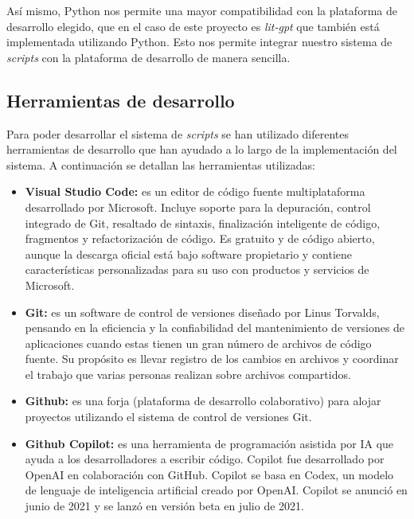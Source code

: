 Así mismo, Python nos permite una mayor compatibilidad con la plataforma de desarrollo elegido, que en el caso
de este proyecto es \textit{lit-gpt} que también está implementada utilizando Python. Esto nos permite
integrar nuestro sistema de \textit{scripts} con la plataforma de desarrollo de manera sencilla.

\subsection{Herramientas de desarrollo}
\label{subsec:herramientas_desarrollo}


Para poder desarrollar el sistema de \textit{scripts} se han utilizado diferentes herramientas de desarrollo que han 
ayudado a lo largo de la implementación del sistema. A continuación se detallan las herramientas utilizadas:

\begin{itemize}
    \item \textbf{Visual Studio Code:} es un editor de código fuente multiplataforma desarrollado por Microsoft.
        Incluye soporte para la depuración, control integrado de Git, resaltado de sintaxis, 
        finalización inteligente de código, fragmentos y refactorización de código. Es gratuito y de código abierto,
        aunque la descarga oficial está bajo software propietario y contiene características personalizadas 
        para su uso con productos y servicios de Microsoft. \cite{VisualStudioCode}
    \item \textbf{Git:} es un software de control de versiones diseñado por Linus Torvalds, pensando en la
        eficiencia y la confiabilidad del mantenimiento de versiones de aplicaciones cuando estas tienen un
        gran número de archivos de código fuente. Su propósito es llevar registro de los cambios en archivos
        y coordinar el trabajo que varias personas realizan sobre archivos compartidos. \cite{Git}
    \item \textbf{Github:} es una forja (plataforma de desarrollo colaborativo) para alojar proyectos utilizando
        el sistema de control de versiones Git. \cite{Github}
    \item \textbf{Github Copilot:} es una herramienta de programación asistida por IA que ayuda a los desarrolladores
        a escribir código. Copilot fue desarrollado por OpenAI en colaboración con GitHub. Copilot se basa en Codex,
        un modelo de lenguaje de inteligencia artificial creado por OpenAI. Copilot se anunció en junio de 2021 y
        se lanzó en versión beta en julio de 2021. \cite{GithubCopilot}
\end{itemize}

